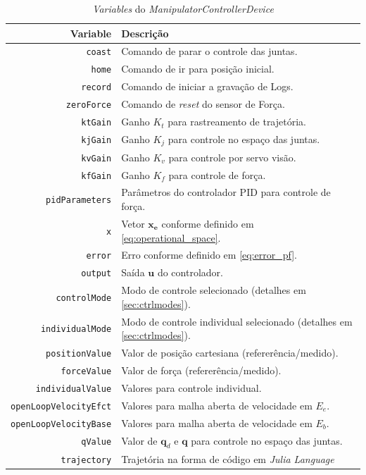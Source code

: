 \begin{table}[h!]
\centering
\caption{\textit{Variables} do \textit{ManipulatorControllerDevice}}
\label{tab:variables}
\begin{tabular}{rl} \hline
Variable & Descrição \\ \hline
\verb|coast| & 				Comando de parar o controle das juntas. \\
\verb|home| &  				Comando de ir para posição inicial. \\
\verb|record|& 				Comando de iniciar a gravação de Logs.\\
\verb|zeroForce|& 			Comando de \textit{reset} do sensor de Força.\\
\verb|ktGain|&				Ganho $K_t$ para rastreamento de trajetória. \\
\verb|kjGain|&				Ganho $K_j$ para controle no espaço das juntas.\\
\verb|kvGain|&				Ganho $K_v$ para controle por servo visão.\\
\verb|kfGain|&				Ganho $K_f$ para controle de força.\\
\verb|pidParameters|&		Parâmetros do controlador PID para controle de força.\\
\verb|x|&					Vetor $\bm{x_e}$ conforme definido em \ref{eq:operational_space}.\\				
\verb|error|&				Erro conforme definido em \ref{eq:error_pf}.\\
\verb|output|&				Saída $\bm{u}$ do controlador.\\
\verb|controlMode|&			Modo de controle selecionado (detalhes em \ref{sec:ctrlmodes}). \\
\verb|individualMode|&		Modo de controle individual selecionado (detalhes em \ref{sec:ctrlmodes}).\\
\verb|positionValue|&		Valor de posição cartesiana (refererência/medido). \\
\verb|forceValue|&			Valor de força (refererência/medido).\\
\verb|individualValue|&		Valores para controle individual.  \\
\verb|openLoopVelocityEfct|&Valores para malha aberta de velocidade em $E_e$. \\
\verb|openLoopVelocityBase|&Valores para malha aberta de velocidade em $E_b$. \\
\verb|qValue|&				Valor de $\bm{q}_d$ e $\bm{q}$ para controle no espaço das juntas.	\\
\verb|trajectory|&			Trajetória na forma de código em \textit{Julia Language}\\
\hline
\end{tabular}
\end{table}

